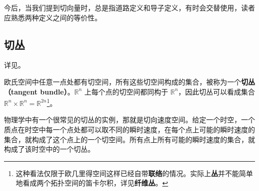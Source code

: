 今后，当我们提到切向量时，总是指道路定义和导子定义，有时会交替使用，读者应熟悉两种定义之间的等价性。

\subsection{切丛}
详见。

欧氏空间中任意一点处都有切空间，所有这些切空间构成的集合，被称为一个\textbf{切丛（tangent bundle）}。$\mathbb{R}^n$ 上每个点的切空间都同构于 $\mathbb{R}^n$，因此切丛可以看成集合 $\mathbb{R}^n\times\mathbb{R}^n=\mathbb{R}^{2n}$\footnote{这种看法仅限于欧几里得空间这样已经自带\textbf{联络}的情况。实际上\textbf{丛}并不能简单地看成两个拓扑空间的笛卡尔积，详见\textbf{纤维丛}。}。

物理学中有一个很常见的切丛的实例，那就是切向速度空间。给定一个时空，一个质点在时空中每一个点处都可以取不同的瞬时速度，在每个点上可能的瞬时速度的集合，就构成了这个点上的一个切空间。所有点上所有可能的瞬时速度的集合，就构成了该时空中的一个切丛。









